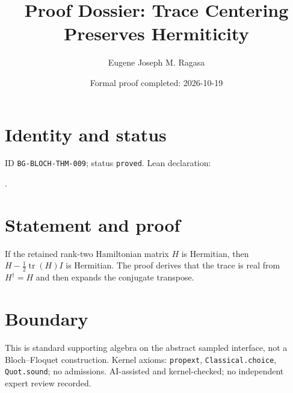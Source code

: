 \documentclass[11pt]{article}
\title{Proof Dossier: Trace Centering Preserves Hermiticity}\author{Eugene Joseph M. Ragasa}\date{Formal proof completed: 2026-10-19}
\begin{document}
\maketitle
\section{Identity and status}
ID \texttt{BG-BLOCH-THM-009}; status \texttt{proved}. Lean declaration:
\par{}.
\section{Statement and proof}
If the retained rank-two Hamiltonian matrix $H$ is Hermitian, then
$H-\tfrac12\operatorname{tr}(H)I$ is Hermitian. The proof derives that the trace is real
from $H^\dagger=H$ and then expands the conjugate transpose.
\section{Boundary}
This is standard supporting algebra on the abstract sampled interface, not a
Bloch--Floquet construction. Kernel axioms: \texttt{propext},
\texttt{Classical.choice}, \texttt{Quot.sound}; no admissions. AI-assisted and
kernel-checked; no independent expert review recorded.
\end{document}
